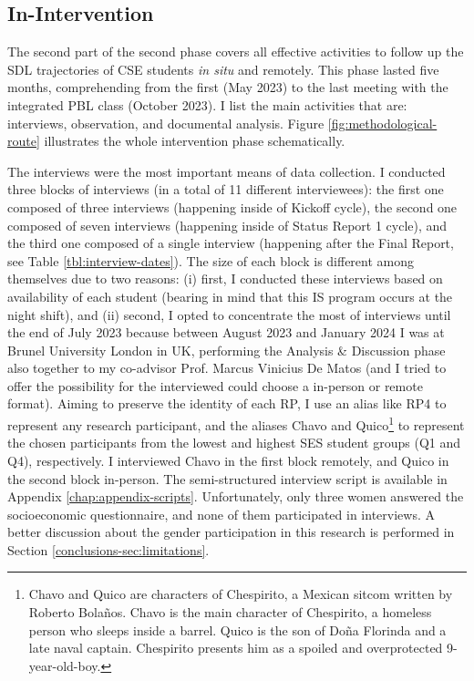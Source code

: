         


\subsection{In-Intervention}
\label{phd-route-ss:in-int}

The second part of the second phase covers all effective activities to follow up the \gls{SDL} trajectories of \gls{CSE} students \textit{in situ} and remotely. This phase lasted five months, comprehending from the first (May 2023) to the last meeting with the integrated \gls{PBL} class (October 2023). I list the main activities that are: interviews, observation, and documental analysis. Figure \ref{fig:methodological-route} illustrates the whole intervention phase schematically. 

The interviews were the most important means of data collection. I conducted three blocks of interviews (in a total of 11 different interviewees): the first one composed of three interviews (happening inside of Kickoff cycle), the second one composed of seven interviews (happening inside of Status Report 1 cycle), and the third one composed of a single interview (happening after the Final Report, see Table \ref{tbl:interview-dates}). The size of each block is different among themselves due to two reasons: (i) first, I conducted these interviews based on availability of each student (bearing in mind that this \gls{IS} program occurs at the night shift), and (ii) second, I opted to concentrate the most of interviews until the end of July 2023 because between August 2023 and January 2024 I was at Brunel University London in \gls{UK}, performing the Analysis \& Discussion phase also together to my co-advisor Prof. Marcus Vinicius De Matos (and I tried to offer the possibility for the interviewed could choose a in-person or remote format). Aiming to preserve the identity of each \gls{RP}, I use an alias like \gls{RP}4 to represent any research participant, and the aliases Chavo and Quico\footnote{Chavo and Quico are characters of Chespirito, a Mexican sitcom written by Roberto Bolaños. Chavo is the main character of Chespirito, a homeless person who sleeps inside a barrel. Quico is the son of Doña Florinda and a late naval captain. Chespirito presents him as a spoiled and overprotected 9-year-old-boy.} to represent the chosen participants from the lowest and highest \gls{SES} student groups (\gls{Q}1 and \gls{Q}4), respectively. I interviewed Chavo in the first block remotely, and Quico in the second block in-person. The semi-structured interview script is available in Appendix \ref{chap:appendix-scripts}. Unfortunately, only three women answered the socioeconomic questionnaire, and none of them participated in interviews. A better discussion about the gender participation in this research is performed in Section \ref{conclusions-sec:limitations}.

